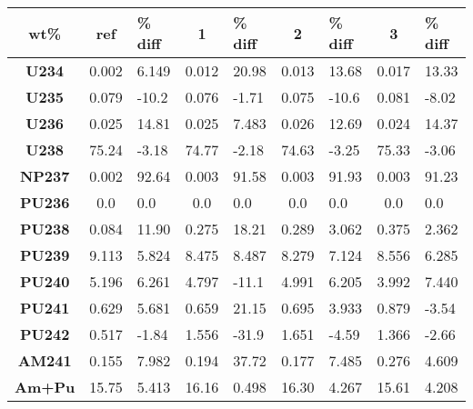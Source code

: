 	\begin{tabular}{c|ca|ca|ca|ca}
		\hline
		\textbf{wt\%} & \textbf{ref}  & \textbf{\% diff} & \textbf{1} & \textbf{\% diff} & \textbf{2} & \textbf{\% diff} & \textbf{3} & \textbf{\% diff}\\ 
		\hline
		\textbf{U234} & 0.002 & 6.149 & 0.012 & 20.98 & 0.013 & 13.68 & 0.017 & 13.33 \\ 
		\textbf{U235} & 0.079 & -10.2 & 0.076 & -1.71 & 0.075 & -10.6 & 0.081 & -8.02 \\ 
		\textbf{U236} & 0.025 & 14.81 & 0.025 & 7.483 & 0.026 & 12.69 & 0.024 & 14.37 \\ 
		\textbf{U238} & 75.24 & -3.18 & 74.77 & -2.18 & 74.63 & -3.25 & 75.33 & -3.06 \\ 
		\textbf{NP237} & 0.002 & 92.64 & 0.003 & 91.58 & 0.003 & 91.93 & 0.003 & 91.23 \\ 
		\textbf{PU236} & 0.0 & 0.0 & 0.0 & 0.0 & 0.0 & 0.0 & 0.0 & 0.0 \\ 
		\textbf{PU238} & 0.084 & 11.90 & 0.275 & 18.21 & 0.289 & 3.062 & 0.375 & 2.362 \\ 
		\textbf{PU239} & 9.113 & 5.824 & 8.475 & 8.487 & 8.279 & 7.124 & 8.556 & 6.285 \\ 
		\textbf{PU240} & 5.196 & 6.261 & 4.797 & -11.1 & 4.991 & 6.205 & 3.992 & 7.440 \\ 
		\textbf{PU241} & 0.629 & 5.681 & 0.659 & 21.15 & 0.695 & 3.933 & 0.879 & -3.54 \\ 
		\textbf{PU242} & 0.517 & -1.84 & 1.556 & -31.9 & 1.651 & -4.59 & 1.366 & -2.66 \\ 
		\textbf{AM241} & 0.155 & 7.982 & 0.194 & 37.72 & 0.177 & 7.485 & 0.276 & 4.609 \\ 
		\hline
		\hline
		\textbf{Am+Pu} & 15.75 & 5.413 & 16.16 & 0.498 & 16.30 & 4.267 & 15.61 & 4.208 \\ 
		\hline 
	\end{tabular} 
